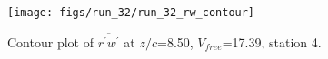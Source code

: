\begin{figure}[H]
\centering
\texttt{[image: figs/run\_32/run\_32\_rw\_contour]}
\caption{Contour plot of $\overline{r^\prime w^\prime}$ at $z/c$=8.50, $V_{free}$=17.39, station 4.}
\label{fig:run_32_rw_contour}
\end{figure}


